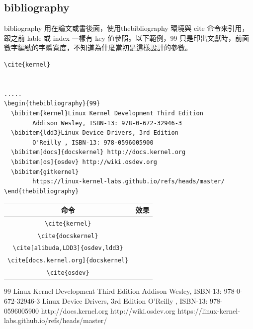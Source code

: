   \subsection{bibliography}
  bibliography 用在論文或書後面，使用thebibliography 環境與 cite 命令來引用，
  跟之前 lable 或 index 一樣有 key 值參照。以下範例，99 只是印出文獻時，前面
  數字編號的字體寬度，不知道為什麼當初是這樣設計的參數。
  \begin{verbatim}
\cite{kernel}


.....
\begin{thebibliography}{99}
  \bibitem{kernel}Linux Kernel Development Third Edition
        Addison Wesley, ISBN-13: 978-0-672-32946-3
  \bibitem{ldd3}Linux Device Drivers, 3rd Edition
        O'Reilly , ISBN-13: 978-0596005900
  \bibitem[docs]{docskernel} http://docs.kernel.org
  \bibitem[os]{osdev} http://wiki.osdev.org
  \bibitem{gitkernel}
        https://linux-kernel-labs.github.io/refs/heads/master/
\end{thebibliography}
  \end{verbatim}
  \begin{tabular}{cc}
    命令 & 效果 \\
    \hline
    \verb=\cite{kernel}=& \cite{kernel} \\
    \verb=\cite{docskernel}=& \cite{docskernel}\\
    \verb=\cite[alibuda,LDD3]{osdev,ldd3}=& \cite[alibuda,LDD3]{osdev,ldd3}\\
    \verb=\cite[docs.kernel.org]{docskernel}=& \cite[docs.kernel.org]{docskernel}\\
    \verb=\cite{osdev}=& \cite{osdev}\\
  \end{tabular}
  \begin{thebibliography}{99}
    Linux Kernel Development Third Edition
      Addison Wesley, ISBN-13: 978-0-672-32946-3
    Linux Device Drivers, 3rd Edition
      O'Reilly , ISBN-13: 978-0596005900
     http://docs.kernel.org
     http://wiki.osdev.org
      https://linux-kernel-labs.github.io/refs/heads/master/
  \end{thebibliography}

